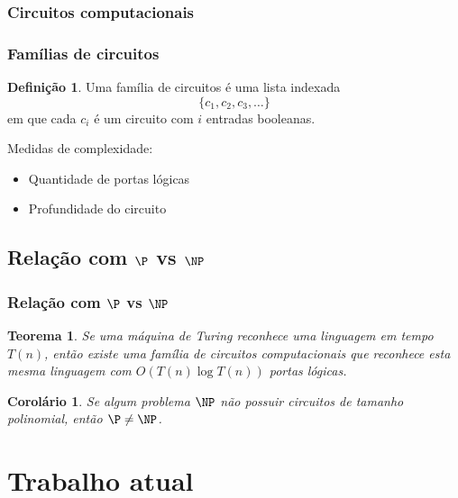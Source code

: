 \documentclass[utf8,notheorems]{beamer}
\newtheorem*{theorem}{Teorema}
\newtheorem*{corollary}{Corolário}
\theoremstyle{definition}
\newtheorem*{definition}{Definição}
\begin{document}
\begin{frame}
    \frametitle{Circuitos computacionais}
    \centering
\end{frame}

\begin{frame}
    \frametitle{Famílias de circuitos}
    \begin{definition}
        Uma família de circuitos é uma lista indexada
        \begin{equation*}
            \{c_1, c_2, c_3, \dots\}
        \end{equation*}
        em que cada $c_i$ é um circuito com $i$ entradas booleanas.
    \end{definition}

    \pause
    Medidas de complexidade:
    \begin{itemize}
        \item Quantidade de portas lógicas
        \item Profundidade do circuito
    \end{itemize}
\end{frame}

\subsection{Relação com $\P$ vs $\NP$}
\begin{frame}
    \frametitle{Relação com $\P$ vs $\NP$}
    \begin{theorem}
        Se uma máquina de Turing reconhece uma linguagem em tempo $T(n)$,
        então existe uma família de circuitos computacionais
        que reconhece esta mesma linguagem
        com $O(T(n) \log T(n))$ portas lógicas.
    \end{theorem}
    \pause
    \begin{corollary}
        Se algum problema $\NP$
        não possuir circuitos de tamanho polinomial,
        então $\P \neq \NP$.
    \end{corollary}
\end{frame}


\section{Trabalho atual}
\end{document}
